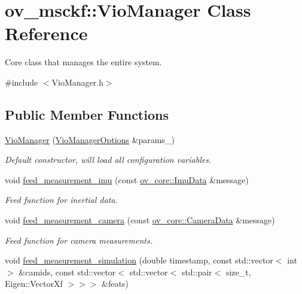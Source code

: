 \hypertarget{classov__msckf_1_1VioManager}{}\section{ov\+\_\+msckf\+:\+:Vio\+Manager Class Reference}
\label{classov__msckf_1_1VioManager}


Core class that manages the entire system.  




{\ttfamily \#include $<$Vio\+Manager.\+h$>$}

\subsection*{Public Member Functions}
\begin{DoxyCompactItemize}
\item 
\hyperlink{classov__msckf_1_1VioManager_aa2376a11794739f8d7811d6e7c0dd447}{Vio\+Manager} (\hyperlink{structov__msckf_1_1VioManagerOptions}{Vio\+Manager\+Options} \&params\+\_\+)
\begin{DoxyCompactList}\small\item\em Default constructor, will load all configuration variables. \end{DoxyCompactList}\item 
void \hyperlink{classov__msckf_1_1VioManager_a5e7dde1c28eb800c663fb2e238cc60ea}{feed\+\_\+measurement\+\_\+imu} (const \hyperlink{structov__core_1_1ImuData}{ov\+\_\+core\+::\+Imu\+Data} \&message)
\begin{DoxyCompactList}\small\item\em Feed function for inertial data. \end{DoxyCompactList}\item 
void \hyperlink{classov__msckf_1_1VioManager_a96cd1d24579772a7e1f6c6ff068dc489}{feed\+\_\+measurement\+\_\+camera} (const \hyperlink{structov__core_1_1CameraData}{ov\+\_\+core\+::\+Camera\+Data} \&message)
\begin{DoxyCompactList}\small\item\em Feed function for camera measurements. \end{DoxyCompactList}\item 
void \hyperlink{classov__msckf_1_1VioManager_a12eedc237bb96866b368dc87d7f53aa5}{feed\+\_\+measurement\+\_\+simulation} (double timestamp, const std\+::vector$<$ int $>$ \&camids, const std\+::vector$<$ std\+::vector$<$ std\+::pair$<$ size\+\_\+t, Eigen\+::\+Vector\+Xf $>$$>$$>$ \&feats)

\end{DoxyCompactItemize}
